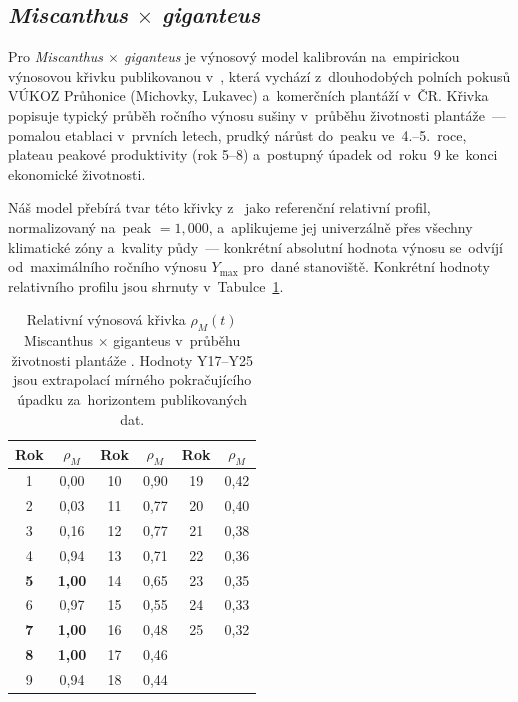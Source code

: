 \subsection{\textit{Miscanthus $\times$ giganteus}}
\label{subsec:miscanthus-vynosy}

Pro \textit{Miscanthus $\times$ giganteus} je výnosový model kalibrován
na~empirickou výnosovou křivku publikovanou v~\citet{Weger2021}, která
vychází z~dlouhodobých polních pokusů VÚKOZ Průhonice (Michovky, Lukavec)
a~komerčních plantáží v~ČR. Křivka popisuje typický průběh ročního výnosu
sušiny v~průběhu životnosti plantáže~--- pomalou etablaci v~prvních
letech, prudký nárůst do~peaku ve~4.--5.~roce, plateau peakové
produktivity (rok 5--8) a~postupný úpadek od~roku~9 ke~konci ekonomické
životnosti.

Náš model přebírá tvar této křivky z~\citet{Weger2021} jako referenční
relativní profil, normalizovaný na~peak $=1{,}000$, a~aplikujeme jej
univerzálně přes všechny klimatické zóny a~kvality půdy~--- konkrétní
absolutní hodnota výnosu se~odvíjí od~maximálního ročního výnosu
$Y_{\max}$ pro~dané stanoviště. Konkrétní hodnoty relativního profilu
jsou shrnuty v~Tabulce~\ref{tab:miscanthus-yield-curve}.

\begin{table}[H]
\centering
\caption{Relativní výnosová křivka $\rho_M(t)$ Miscanthus $\times$ giganteus
v~průběhu životnosti plantáže . Hodnoty Y17--Y25 jsou extrapolací mírného pokračujícího úpadku za~horizontem
publikovaných dat.}
\label{tab:miscanthus-yield-curve}
\small
\begin{tabular}{cc|cc|cc}
\toprule
\textbf{Rok} & $\rho_M$ & \textbf{Rok} & $\rho_M$ & \textbf{Rok} & $\rho_M$ \\
\midrule
1 & 0{,}00 & 10 & 0{,}90 & 19 & 0{,}42 \\
2 & 0{,}03 & 11 & 0{,}77 & 20 & 0{,}40 \\
3 & 0{,}16 & 12 & 0{,}77 & 21 & 0{,}38 \\
4 & 0{,}94 & 13 & 0{,}71 & 22 & 0{,}36 \\
\textbf{5} & \textbf{1{,}00} & 14 & 0{,}65 & 23 & 0{,}35 \\
6 & 0{,}97 & 15 & 0{,}55 & 24 & 0{,}33 \\
\textbf{7} & \textbf{1{,}00} & 16 & 0{,}48 & 25 & 0{,}32 \\
\textbf{8} & \textbf{1{,}00} & 17 & 0{,}46 &  &  \\
9 & 0{,}94 & 18 & 0{,}44 &  &  \\
\bottomrule
\end{tabular}
\end{table}

